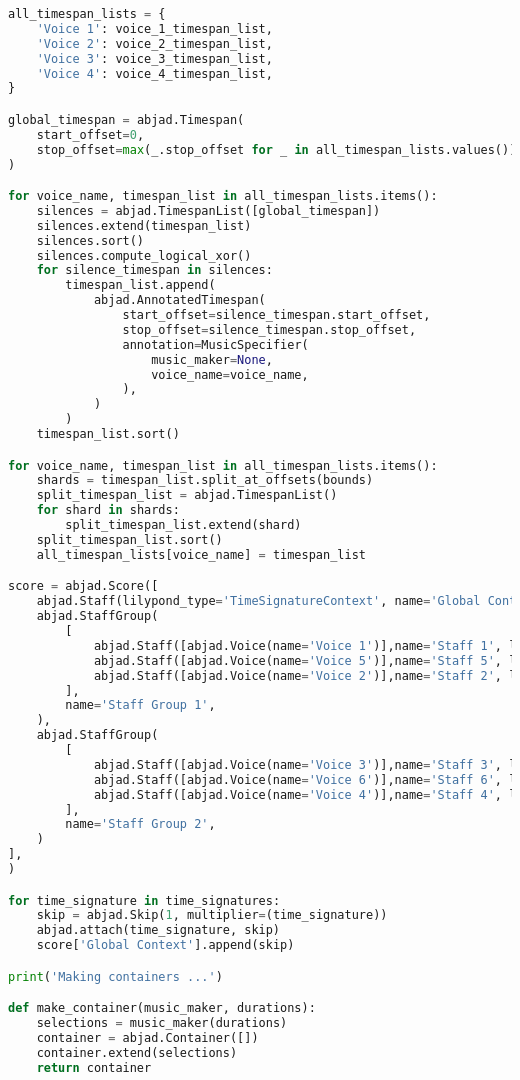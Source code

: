 \begin{lstlisting}[language=Python, caption=Cthar Segment\_I]
all_timespan_lists = {
    'Voice 1': voice_1_timespan_list,
    'Voice 2': voice_2_timespan_list,
    'Voice 3': voice_3_timespan_list,
    'Voice 4': voice_4_timespan_list,
}

global_timespan = abjad.Timespan(
    start_offset=0,
    stop_offset=max(_.stop_offset for _ in all_timespan_lists.values())
)

for voice_name, timespan_list in all_timespan_lists.items():
    silences = abjad.TimespanList([global_timespan])
    silences.extend(timespan_list)
    silences.sort()
    silences.compute_logical_xor()
    for silence_timespan in silences:
        timespan_list.append(
            abjad.AnnotatedTimespan(
                start_offset=silence_timespan.start_offset,
                stop_offset=silence_timespan.stop_offset,
                annotation=MusicSpecifier(
                    music_maker=None,
                    voice_name=voice_name,
                ),
            )
        )
    timespan_list.sort()

for voice_name, timespan_list in all_timespan_lists.items():
    shards = timespan_list.split_at_offsets(bounds)
    split_timespan_list = abjad.TimespanList()
    for shard in shards:
        split_timespan_list.extend(shard)
    split_timespan_list.sort()
    all_timespan_lists[voice_name] = timespan_list

score = abjad.Score([
    abjad.Staff(lilypond_type='TimeSignatureContext', name='Global Context'),
    abjad.StaffGroup(
        [
            abjad.Staff([abjad.Voice(name='Voice 1')],name='Staff 1', lilypond_type='BowStaff',),
            abjad.Staff([abjad.Voice(name='Voice 5')],name='Staff 5', lilypond_type='BeamStaff',),
            abjad.Staff([abjad.Voice(name='Voice 2')],name='Staff 2', lilypond_type='Staff',),
        ],
        name='Staff Group 1',
    ),
    abjad.StaffGroup(
        [
            abjad.Staff([abjad.Voice(name='Voice 3')],name='Staff 3', lilypond_type='BowStaff',),
            abjad.Staff([abjad.Voice(name='Voice 6')],name='Staff 6', lilypond_type='BeamStaff',),
            abjad.Staff([abjad.Voice(name='Voice 4')],name='Staff 4', lilypond_type='Staff',),
        ],
        name='Staff Group 2',
    )
],
)

for time_signature in time_signatures:
    skip = abjad.Skip(1, multiplier=(time_signature))
    abjad.attach(time_signature, skip)
    score['Global Context'].append(skip)

print('Making containers ...')

def make_container(music_maker, durations):
    selections = music_maker(durations)
    container = abjad.Container([])
    container.extend(selections)
    return container


\end{lstlisting}
